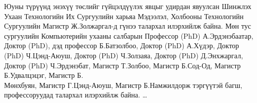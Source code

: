 
\begin{acknowledgements}
\addchaptertocentry{\acknowledgementname}

Юуны түрүүнд энэхүү төслийг гүйцэлдүүлэх явцыг удирдан явуулсан Шинжлэх Ухаан Технологийн Их Сургуулийн харьяа Мэдээлэл, Холбооны Технологийн Сургуулийн Магистр Ж.Золжаргал-д гүнээ талархал илэрхийлж байна. Мөн тус сургуулийн Компьютерийн ухааны салбарын Профессор (PhD) А.Эрдэнэбаатар, Доктор (PhD), дэд профессор Б.Батзолбоо, Доктор (PhD) А.Хүдэр, Доктор (PhD) Ч.Цэнд-Аюуш, Доктор (PhD) Ч.Золзаяа, Доктор (PhD) Д.Энхжаргал, Доктор (PhD) Ч.Эрдэнэбат, Магистр Т.Золбоо, Магистр Б.Сод-Од, Магистр Б.Удвалцэцэг, Магистр Б.\\Мөнхбуян, Магистр Г.Цэнд-Аюуш, Магистр Б.Намжилдорж тэргүүтэй багш, профессоруудад талархал илэрхийлж байна. \ldots

\end{acknowledgements}

